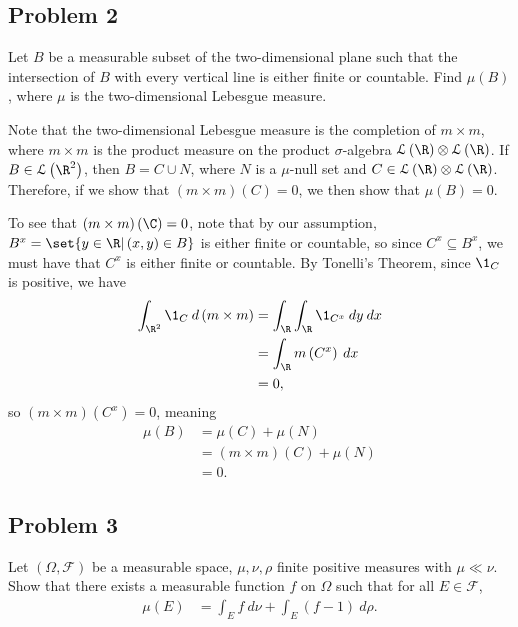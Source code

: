 \documentclass[10pt]{mypackage}
\begin{document}
\subsection{Problem 2}%
\begin{problem}
  Let $B$ be a measurable subset of the two-dimensional plane such that the intersection of $B$ with every vertical line is either finite or countable. Find $\mu\left( B \right)$, where $\mu$ is the two-dimensional Lebesgue measure.
\end{problem}
Note that the two-dimensional Lebesgue measure is the completion of $m\times m$, where $m\times m$ is the product measure on the product $\sigma$-algebra $\mathcal{L}\left( \R \right)\otimes \mathcal{L}\left( \R \right)$. If $B\in \mathcal{L}\left( \R^2 \right)$, then $B = C\cup N$, where $N$ is a $\mu$-null set and $C\in \mathcal{L}\left( \R \right)\otimes \mathcal{L}\left( \R \right)$. Therefore, if we show that $\left( m\times m \right)\left( C \right) = 0$, we then show that $\mu\left( B \right) = 0$.\newline

To see that $\left( m\times m \right)\left( \C \right) = 0$, note that by our assumption, $B^{x} = \set{y \in \R | \left( x,y \right)\in B}$ is either finite or countable, so since $C^{x}\subseteq B^{x}$, we must have that $C^{x}$ is either finite or countable. By Tonelli's Theorem, since $\1_{C}$ is positive, we have
\begin{align*}
  \int_{\R^{2}}^{} \1_{C}\:d\left( m\times m \right) &= \int_{\R}^{} \int_{\R}^{} \1_{C^{x}}\:dy\:dx\\
                                                     &= \int_{\R}^{} m\left( C^{x} \right)\:dx\\
                                                     &= 0,
\end{align*}
so $\left( m\times m \right)\left( C^{x} \right) = 0$, meaning
\begin{align*}
  \mu\left( B \right) &= \mu\left( C \right) + \mu\left( N \right)\\
                      &= \left( m\times m \right)\left( C \right) + \mu\left( N \right)\\
                      &= 0.
\end{align*}
\subsection{Problem 3}%
\begin{problem}
  Let $\left( \Omega,\mathcal{F} \right)$ be a measurable space, $\mu,\nu,\rho$ finite positive measures with $\mu\ll\nu$. Show that there exists a measurable function $f$ on $\Omega$ such that for all $E\in \mathcal{F}$,
  \begin{align*}
    \mu\left( E \right) &= \int_{E}^{} f\:d\nu + \int_{E}^{} \left( f-1 \right)\:d\rho.
  \end{align*}
\end{problem}
\end{document}
